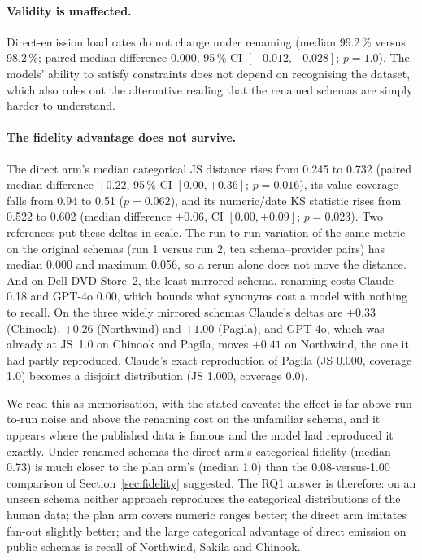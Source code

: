 \documentclass[preprint,12pt]{elsarticle}
\begin{document}
\paragraph{Validity is unaffected.} Direct-emission load rates do not change under renaming (median 99.2\,\% versus 98.2\,\%; paired median difference 0.000, 95\,\% CI $[-0.012, +0.028]$; $p=1.0$). The models' ability to satisfy constraints does not depend on recognising the dataset, which also rules out the alternative reading that the renamed schemas are simply harder to understand.

\paragraph{The fidelity advantage does not survive.} The direct arm's median categorical JS distance rises from 0.245 to 0.732 (paired median difference $+0.22$, 95\,\% CI $[0.00, +0.36]$; $p=0.016$), its value coverage falls from 0.94 to 0.51 ($p=0.062$), and its numeric/date KS statistic rises from 0.522 to 0.602 (median difference $+0.06$, CI $[0.00, +0.09]$; $p=0.023$). Two references put these deltas in scale. The run-to-run variation of the same metric on the original schemas (run 1 versus run 2, ten schema--provider pairs) has median 0.000 and maximum 0.056, so a rerun alone does not move the distance. And on Dell DVD Store~2, the least-mirrored schema, renaming costs Claude 0.18 and GPT-4o 0.00, which bounds what synonyms cost a model with nothing to recall. On the three widely mirrored schemas Claude's deltas are $+0.33$ (Chinook), $+0.26$ (Northwind) and $+1.00$ (Pagila), and GPT-4o, which was already at JS~1.0 on Chinook and Pagila, moves $+0.41$ on Northwind, the one it had partly reproduced. Claude's exact reproduction of Pagila (JS 0.000, coverage 1.0) becomes a disjoint distribution (JS 1.000, coverage 0.0).

We read this as memorisation, with the stated caveats: the effect is far above run-to-run noise and above the renaming cost on the unfamiliar schema, and it appears where the published data is famous and the model had reproduced it exactly. Under renamed schemas the direct arm's categorical fidelity (median 0.73) is much closer to the plan arm's (median 1.0) than the 0.08-versus-1.00 comparison of Section~\ref{sec:fidelity} suggested. The RQ1 answer is therefore: on an unseen schema neither approach reproduces the categorical distributions of the human data; the plan arm covers numeric ranges better; the direct arm imitates fan-out slightly better; and the large categorical advantage of direct emission on public schemas is recall of Northwind, Sakila and Chinook.
\end{document}
